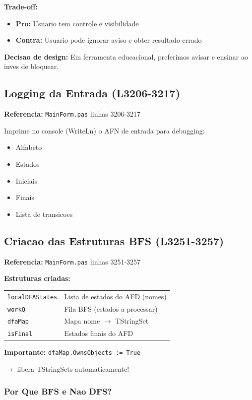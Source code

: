 \documentclass[12pt,a4paper]{article}
\begin{document}
\textbf{Trade-off:}
\begin{itemize}
    \item \textbf{Pro:} Usuario tem controle e visibilidade
    \item \textbf{Contra:} Usuario pode ignorar aviso e obter resultado errado
\end{itemize}

\textbf{Decisao de design:} Em ferramenta educacional, preferimos avisar e ensinar ao inves de bloquear.

\subsection{Logging da Entrada (L3206-3217)}

\textbf{Referencia:} \texttt{MainForm.pas} linhas 3206-3217

Imprime no console (WriteLn) o AFN de entrada para debugging:
\begin{itemize}
    \item Alfabeto
    \item Estados
    \item Iniciais
    \item Finais
    \item Lista de transicoes
\end{itemize}

\subsection{Criacao das Estruturas BFS (L3251-3257)}

\textbf{Referencia:} \texttt{MainForm.pas} linhas 3251-3257

\textbf{Estruturas criadas:}

\begin{tabular}{ll}
\texttt{localDFAStates} & Lista de estados do AFD (nomes) \\
\texttt{workQ} & Fila BFS (estados a processar) \\
\texttt{dfaMap} & Mapa nome $\rightarrow$ TStringSet \\
\texttt{isFinal} & Estados finais do AFD \\
\end{tabular}

\textbf{Importante:} \texttt{dfaMap.OwnsObjects := True}

$\rightarrow$ libera TStringSets automaticamente!

\subsubsection{Por Que BFS e Nao DFS?}
\end{document}
